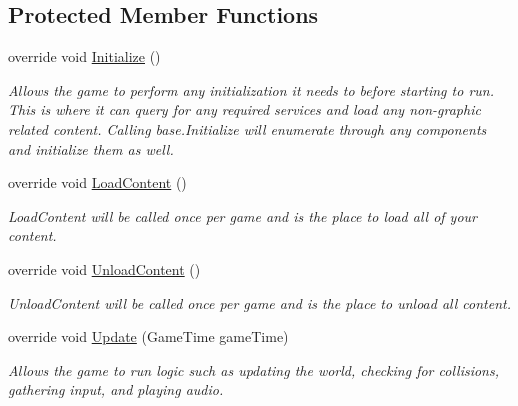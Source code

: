 \subsection*{Protected Member Functions}
\begin{DoxyCompactItemize}
\item 
override void \hyperlink{classgearit_1_1src_1_1_genetic_algorithm_1_1_game_drawing_aa52b69a44aa2f8733cb436b8c240c9e1}{Initialize} ()
\begin{DoxyCompactList}\small\item\em Allows the game to perform any initialization it needs to before starting to run. This is where it can query for any required services and load any non-\/graphic related content. Calling base.\+Initialize will enumerate through any components and initialize them as well. \end{DoxyCompactList}\item 
override void \hyperlink{classgearit_1_1src_1_1_genetic_algorithm_1_1_game_drawing_a7e38cbec5abdff4ba97021392e2d048e}{Load\+Content} ()
\begin{DoxyCompactList}\small\item\em Load\+Content will be called once per game and is the place to load all of your content. \end{DoxyCompactList}\item 
override void \hyperlink{classgearit_1_1src_1_1_genetic_algorithm_1_1_game_drawing_a092901d013abab7d77c61377d96790d4}{Unload\+Content} ()
\begin{DoxyCompactList}\small\item\em Unload\+Content will be called once per game and is the place to unload all content. \end{DoxyCompactList}\item 
override void \hyperlink{classgearit_1_1src_1_1_genetic_algorithm_1_1_game_drawing_ae5ef63bae30ee15c81fc0bca6684de2a}{Update} (Game\+Time game\+Time)
\begin{DoxyCompactList}\small\item\em Allows the game to run logic such as updating the world, checking for collisions, gathering input, and playing audio. \end{DoxyCompactList}\end{DoxyCompactItemize}


